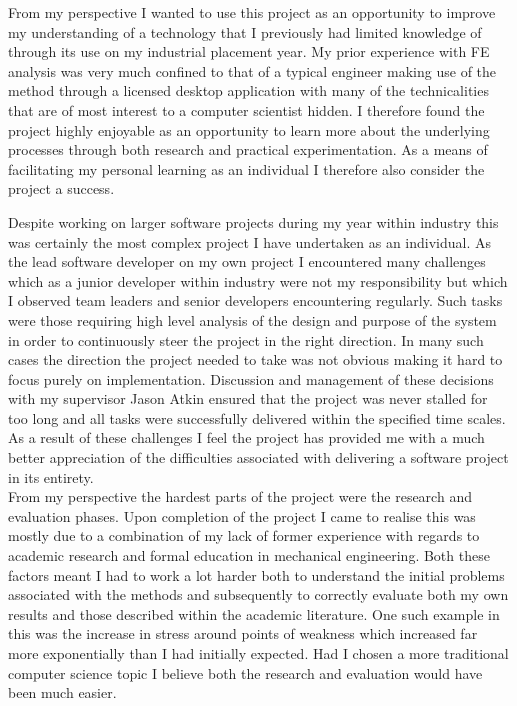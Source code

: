 \noindent
From my perspective I wanted to use this project as an opportunity to improve my understanding of a technology that I previously had limited knowledge of through its use on my industrial placement year. My prior experience with FE analysis was very much confined to that of a typical engineer making use of the method through a licensed desktop application with many of the technicalities that are of most interest to a computer scientist hidden. I therefore found the project highly enjoyable as an opportunity to learn more about the underlying processes through both research and practical experimentation. As a means of facilitating my personal learning as an individual I therefore also consider the project a success.

\noindent
Despite working on larger software projects during my year within industry this was certainly the most complex project I have undertaken as an individual. As the lead software developer on my own project I encountered many challenges which as a junior developer within industry were not my responsibility but which I observed team leaders and senior developers encountering regularly. Such tasks were those requiring high level analysis of the design and purpose of the system in order to continuously steer the project in the right direction. In  many such cases the direction the project needed to take was not obvious making it hard to focus purely on implementation. Discussion and management of these decisions with my supervisor Jason Atkin ensured that the project was never stalled for too long and all tasks were successfully delivered within the specified time scales. As a result of these challenges I feel the project has provided me with a much better appreciation of the difficulties associated with delivering a software project in its entirety. \\ 


\noindent
From my perspective the hardest parts of the project were the research and evaluation phases. Upon completion of the project I came to realise this was mostly due to a combination of my lack of former experience with regards to academic research and formal education in mechanical engineering. Both these factors meant I had to work a lot harder both to understand the initial problems associated with the methods and subsequently to correctly evaluate both my own results and those described within the academic literature. One such example in this was the increase in stress around points of weakness which increased far more exponentially than I had initially expected. Had I chosen a more traditional computer science topic I believe both the research and evaluation would have been much easier. \\ 


